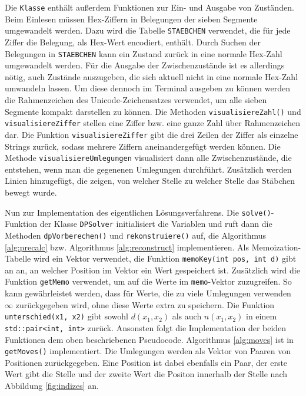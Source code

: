 \documentclass[a4paper,10pt,ngerman]{scrartcl}
\begin{document}
Die \lstinline{Klasse} enthält außerdem Funktionen zur Ein- und Ausgabe von Zuständen. Beim Einlesen müssen Hex-Ziffern in Belegungen der sieben Segmente umgewandelt werden. Dazu wird die Tabelle \lstinline{STAEBCHEN} verwendet, die für jede Ziffer die Belegung, als Hex-Wert encodiert, enthält. 
Durch Suchen der Belegungen in \lstinline{STAEBCHEN} kann ein Zustand zurück in eine normale Hex-Zahl umgewandelt werden. 
Für die Ausgabe der Zwischenzustände ist es allerdings nötig, auch Zustände auszugeben, die sich aktuell nicht in eine normale Hex-Zahl umwandeln lassen.
Um diese dennoch im Terminal ausgeben zu können werden die Rahmenzeichen des Unicode-Zeichensatzes verwendet, um alle sieben Segmente kompakt darstellen zu können.
Die Methoden \lstinline{visualisiereZahl()} und \lstinline{visualisiereZiffer} stellen eine Ziffer bzw. eine ganze Zahl über Rahmenzeichen dar. 
Die Funktion \lstinline{visualisiereZiffer} gibt die drei Zeilen der Ziffer als einzelne Strings zurück, sodass mehrere Ziffern aneinandergefügt werden können.
Die Methode \lstinline{visualisiereUmlegungen} visualisiert dann alle Zwischenzustände, die entstehen, wenn man die gegenenen Umlegungen durchführt. Zusätzlich werden Linien hinzugefügt, die zeigen, von welcher Stelle zu welcher Stelle das Stäbchen bewegt wurde. 

Nun zur Implementation des eigentlichen Lösungsverfahrens. 
Die \lstinline{solve()}-Funktion  der Klasse \lstinline{DPSolver} initialisiert die Variablen und ruft dann die Methoden \lstinline{dpVorberechen()} und \lstinline{rekonstruiere()}  auf, die Algorithmus \ref*{alg:precalc} bzw. Algorithmus \ref{alg:reconstruct} implementieren.
Als Memoization-Tabelle wird ein Vektor verwendet, die Funktion \lstinline{memoKey(int pos, int d)} gibt an an, an welcher Position im Vektor ein Wert gespeichert ist. 
Zusätzlich wird die Funktion \lstinline{getMemo} verwendet, um auf die Werte im \lstinline{memo}-Vektor zuzugreifen. 
So kann gewährleistet werden, dass für Werte, die zu viele Umlegungen verwenden $\infty$ zurückgegeben wird, ohne diese Werte extra zu speichern. 
Die Funktion \lstinline{unterschied(x1, x2)} gibt sowohl $d(x_1, x_2)$ als auch $n(x_1, x_2)$ in einem \lstinline{std::pair<int, int>} zurück. 
Ansonsten folgt die Implementation der beiden Funktionen dem oben beschriebenen Pseudocode. 
Algorithmus \ref{alg:moves} ist in \lstinline{getMoves()} implementiert. 
Die Umlegungen werden als Vektor von Paaren von Positionen zurückgegeben.
Eine Position ist dabei ebenfalls ein Paar, der erste Wert gibt die Stelle und der zweite Wert die Positon innerhalb der Stelle nach Abbildung \ref{fig:indizes} an.
\end{document}
